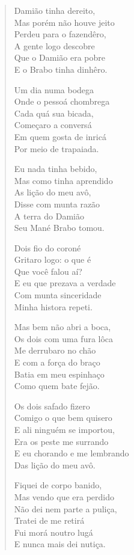 \begin{verse}
Damião tinha dereito,\\
Mas porém não houve jeito\\
Perdeu para o fazendêro,\\
A gente logo descobre\\
Que o Damião era pobre\\
E o Brabo tinha dinhêro.

Um dia numa bodega\\
Onde o pessoá chombrega\\
Cada quá sua bicada,\\
Começaro a conversá\\
Em quem gosta de inricá\\
Por meio de trapaiada.

Eu nada tinha bebido,\\
Mas como tinha aprendido\\
As lição do meu avô,\\
Disse com munta razão\\
A terra do Damião\\
Seu Mané Brabo tomou.

Dois fio do coroné\\
Gritaro logo: o que é\\
Que você falou aí?\\
E eu que prezava a verdade\\
Com munta sinceridade\\
Minha histora repeti.

Mas bem não abri a boca,\\
Os dois com uma fura lôca\\
Me derrubaro no chão\\
E com a força do braço\\
Batia em meu espinhaço\\
Como quem bate fejão.

Os dois safado fizero\\
Comigo o que bem quisero\\
E ali ninguém se importou,\\
Era os peste me surrando\\
E eu chorando e me lembrando\\
Das lição do meu avô.

Fiquei de corpo banido,\\
Mas vendo que era perdido\\
Não dei nem parte a puliça,\\
Tratei de me retirá\\ 
Fui morá noutro lugá\\
E nunca mais dei nutiça.


\end{verse}
